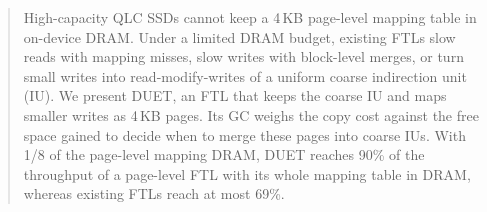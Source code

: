 \begin{abstract}
High-capacity QLC SSDs cannot keep a 4\,KB page-level mapping table in
on-device DRAM. Under a limited DRAM budget, existing FTLs slow reads with
mapping misses, slow writes with block-level merges, or turn small writes into
read-modify-writes of a uniform coarse indirection unit (IU). We present DUET,
an FTL that keeps the coarse IU and maps smaller writes as 4\,KB pages. Its GC weighs the copy cost against the free space gained to decide when to merge these pages into coarse IUs. With 1/8 of the page-level mapping DRAM,
DUET reaches 90\% of the throughput of a page-level FTL with its whole mapping table in DRAM,
whereas existing FTLs reach at most 69\%.
\end{abstract}
